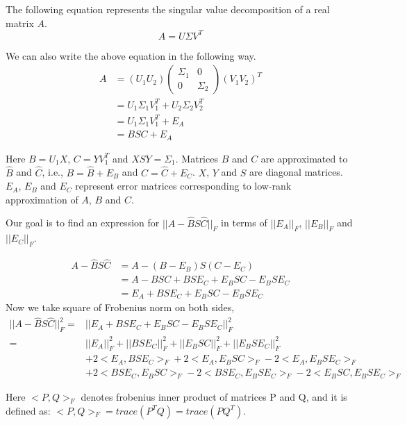 \documentclass[runningheads]{llncs}
\begin{document}
The following equation represents the singular value decomposition of a real matrix $A$.
\begin{equation*}
A=U\Sigma V^T
\end{equation*}

\noindent We can also write the above equation in the following way.
\begin{align*}
A&=(U_1 U_2)\begin{pmatrix}
\Sigma_1 & 0\\
0 & \Sigma_2
\end{pmatrix}(V_1 V_2)^T\\
&= U_1\Sigma_1 V_1^T + U_2 \Sigma_2 V_2^T\\
&= U_1\Sigma_1 V_1^T + E_A \\
&= BSC + E_A
\end{align*}

\noindent Here $B = U_1 X$, $C=YV_1^T$ and $XSY = \Sigma_1$. Matrices $B$ and $C$ are approximated to $\hat{B}$ and $\hat{C}$, i.e., $B = \hat{B} + E_B$ and $C = \hat{C} + E_C$. $X$, $Y$ and $S$ are diagonal matrices. $E_A$, $E_B$ and $E_C$ represent error matrices corresponding to low-rank approximation of $A$, $B$ and $C$.

\noindent Our goal is to find an expression for $||A - \hat{B} S \hat{C}||_F$ in terms of $||E_A||_F$, $||E_B||_F$ and $||E_C||_F$.

\begin{align*}
A - \hat{B} S \hat{C} &= A - (B-E_B)S(C-E_C)\\
&= A - BSC + BSE_C + E_BSC - E_BSE_C\\
&= E_A + BSE_C + E_BSC - E_BSE_C
\end{align*}
Now we take square of Frobenius norm on both sides,
\begin{align*}
||A - \hat{B} S \hat{C}||_F^2 =& ||E_A + BSE_C + E_BSC - E_BSE_C||_F^2 \\
=& ||E_A||_F^2 + ||BSE_C||_F^2 + ||E_BSC||_F^2 + ||E_BSE_C||_F^2 \\
& + 2\boldsymbol{<}E_A, BSE_C\boldsymbol{>}_F + 2<E_A, E_BSC>_F -2 <E_A, E_BSE_C>_F\\
& + 2 <BSE_C, E_BSC>_F -2 <BSE_C, E_BSE_C>_F - 2<E_BSC, E_BSE_C>_F
\end{align*}

\noindent Here $<P, Q>_F$ denotes frobenius inner product of matrices P and Q, and it is defined as: $<P, Q>_F = trace(P^TQ) = trace(PQ^T)$.
\end{document}
